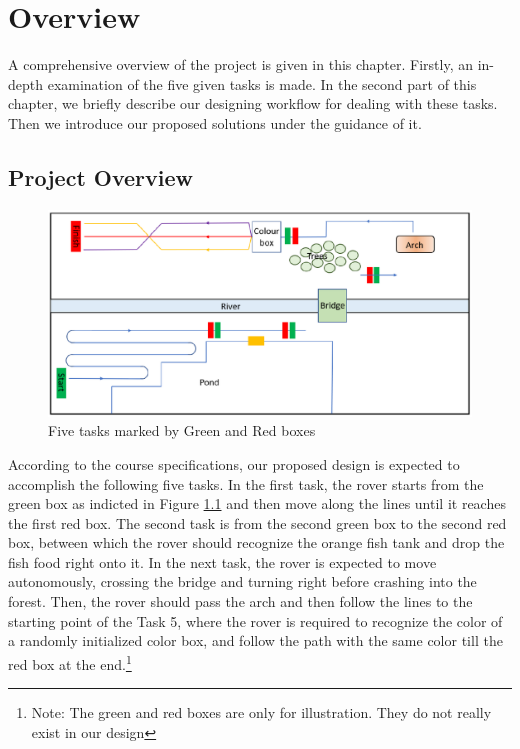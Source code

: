 \chapter{Overview\label{chap2}}
A comprehensive overview of the project is given in this chapter. Firstly, an in-depth examination of the five given tasks is made. In the second part of this chapter, we briefly describe our designing workflow for dealing with these  tasks. Then we introduce our proposed solutions under the guidance of it.
\section{Project Overview\label{sec2.1}}
\begin{figure}[htbp]
    \centering
    \includegraphics[width=15cm]{overview/img_overview/patio.png}
    \caption{Five tasks marked by Green and Red boxes}
    \label{fig:patio}
\end{figure}
According to the course specifications, our proposed design is expected to accomplish the following five tasks. In the first task, the rover starts from the green box as indicted in Figure \ref{fig:patio} and then move along the lines  until it reaches the first red box. The second task is from the second green box to the second red box, between which the rover should recognize the orange fish tank and drop the fish food right onto it. In the next task, the rover is expected to move autonomously, crossing the bridge and turning right before crashing into the forest. Then, the rover should pass the arch and then follow the lines to the starting point of the Task 5, where the rover is required to recognize the color of a randomly initialized color box, and follow the path with the same color till the red box 
at the end.\footnote{Note: The green and red boxes are only for illustration. They do not really exist in our design}



